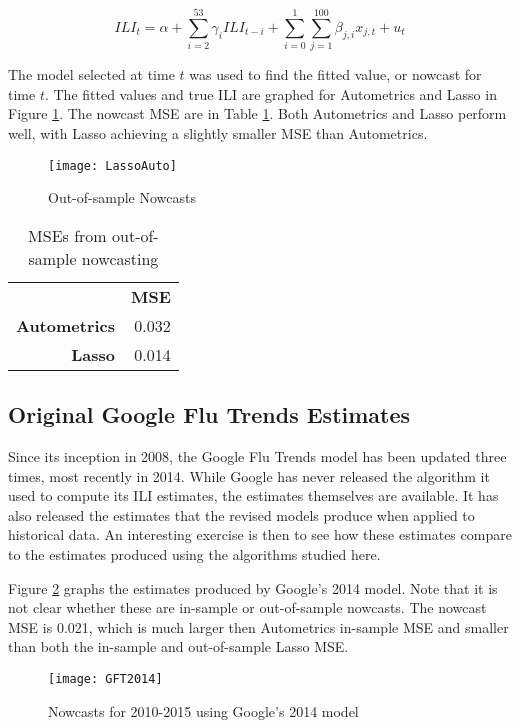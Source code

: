 \documentclass[11pt, oneside]{book}   	%
\begin{document}
$$ILI_{t}= \alpha + \sum_{i=2}^{53}\gamma_{i}ILI_{t-i}+ \sum_{i=0}^{1}\sum_{j=1}^{100}\beta_{j,i}x_{j,t}+u_{t}$$

The model selected at time $t$ was used to find the fitted value, or nowcast for time $t$. The fitted values and true ILI are graphed for Autometrics and Lasso in Figure \ref{fig:OutofSample}. The nowcast MSE are in Table \ref{MSEoutofsample}. Both Autometrics and Lasso perform well, with Lasso achieving a slightly smaller MSE than Autometrics. 

\begin{figure}
\centering
\texttt{[image: LassoAuto]}
\caption{Out-of-sample Nowcasts}
\label{fig:OutofSample}
\end{figure}

\begin{table}
\centering
\begin{tabular}{rr}
 & \textbf{MSE} \\
\textbf{Autometrics} & 0.032 \\
\textbf{Lasso} & 0.014 \\

    \end{tabular}%
      \caption{MSEs from out-of-sample nowcasting}
  \label{MSEoutofsample}%
\end{table}%

\subsection{Original Google Flu Trends Estimates}

Since its inception in 2008, the Google Flu Trends model has been updated three times, most recently in 2014. While Google has never released the algorithm it used to compute its ILI estimates, the estimates themselves are available. It has also released the estimates that the revised models produce when applied to historical data. An interesting exercise is then to see how these estimates compare to the estimates produced using the algorithms studied here. 

Figure \ref{fig:2014GFT} graphs the estimates produced by Google's 2014 model. Note that it is not clear whether these are in-sample or out-of-sample nowcasts. The nowcast MSE is 0.021, which is much larger then Autometrics in-sample MSE and smaller than both the in-sample and out-of-sample Lasso MSE.  


\begin{figure}
\centering
\texttt{[image: GFT2014]}
\caption{Nowcasts for 2010-2015 using Google's 2014 model}
\label{fig:2014GFT}
\end{figure}
\end{document}
